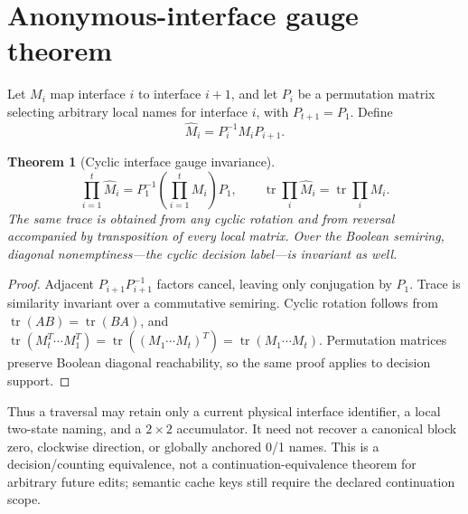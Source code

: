 \documentclass[11pt]{article}
\newtheorem{theorem}{Theorem}
\begin{document}
\section{Anonymous-interface gauge theorem}
Let $M_i$ map interface $i$ to interface $i+1$, and let $P_i$ be a permutation
matrix selecting arbitrary local names for interface $i$, with $P_{t+1}=P_1$.
Define
\[
  \widehat M_i=P_i^{-1}M_iP_{i+1}.
\]
\begin{theorem}[Cyclic interface gauge invariance]
\[
 \prod_{i=1}^{t}\widehat M_i
   =P_1^{-1}\left(\prod_{i=1}^{t}M_i\right)P_1,
 \qquad
 \operatorname{tr}\prod_i\widehat M_i
   =\operatorname{tr}\prod_iM_i.
\]
The same trace is obtained from any cyclic rotation and from reversal accompanied
by transposition of every local matrix.  Over the Boolean semiring, diagonal
nonemptiness---the cyclic decision label---is invariant as well.
\end{theorem}
\begin{proof}
Adjacent $P_{i+1}P_{i+1}^{-1}$ factors cancel, leaving only conjugation by
$P_1$.  Trace is similarity invariant over a commutative semiring.  Cyclic
rotation follows from $\operatorname{tr}(AB)=\operatorname{tr}(BA)$, and
\(
\operatorname{tr}(M_t^{T}\cdots M_1^{T})
=\operatorname{tr}((M_1\cdots M_t)^T)
=\operatorname{tr}(M_1\cdots M_t).
\)
Permutation matrices preserve Boolean diagonal reachability, so the same proof
applies to decision support.
\end{proof}

Thus a traversal may retain only a current physical interface identifier, a local
two-state naming, and a $2\times2$ accumulator.  It need not recover a canonical
block zero, clockwise direction, or globally anchored 0/1 names.  This is a
decision/counting equivalence, not a continuation-equivalence theorem for arbitrary
future edits; semantic cache keys still require the declared continuation scope.
\end{document}
